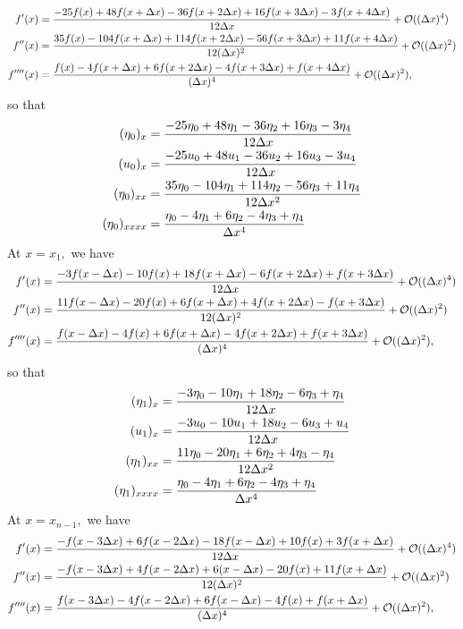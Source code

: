 \documentclass[10pt,reqno,oneside,a4paper]{article}
\begin{document}
\begin{align*}
f'(x)&= \frac{-25f(x) +48 f(x+\Delta x) -36f(x+ 2\Delta x) +16f(x+3\Delta x) - 3f(x+4\Delta x) }{12\Delta x} + \mathcal{O}((\Delta x)^4) \\
f''(x)&= \frac{35f(x)- 104 f(x+\Delta x) + 114 f(x+ 2\Delta x) - 56f(x+3\Delta x) + 11f(x+4\Delta x) }{12(\Delta x)^2} + \mathcal{O}((\Delta x)^2) \\
f''''(x)&= \frac{f(x) -4 f(x+\Delta x) + 6f (x+2\Delta x)- 4f(x+ 3\Delta x) + f(x+4\Delta x)}{(\Delta x)^4} + \mathcal{O}((\Delta x)^2),
\end{align*}
so that 
\begin{align*}
(\eta_0)_x &= \frac{-25\eta_0 +48 \eta_{1} -36\eta_2+16\eta_3 - 3\eta_4}{12\Delta x} \\
(u_0)_x &= \frac{-25u_0 +48 u_{1} -36u_2+16u_3 - 3u_4}{12\Delta x} \\
(\eta_0)_{xx} &= \frac{35\eta_0 -104 \eta_{1} +114 \eta_2 -56\eta_3 + 11\eta_4}{12\Delta x^2} \\
(\eta_0)_{xxxx} &= \frac{\eta_0 -4 \eta_{1} +6 \eta_2 -4\eta_3 + \eta_4}{\Delta x^4}
\end{align*}
At $x= x_1,$ we have 
\begin{align*}
f'(x)&= \frac{-3f(x-\Delta x) -10 f(x) +18f(x+ \Delta x) -6f(x+2\Delta x) + f(x+3\Delta x) }{12\Delta x} + \mathcal{O}((\Delta x)^4) \\
f''(x)&= \frac{11f(x-\Delta x) -20 f(x) +6f(x+ \Delta x) +4f(x+2\Delta x) - f(x+3\Delta x)}{12(\Delta x)^2} + \mathcal{O}((\Delta x)^2) \\
f''''(x)&= \frac{f(x-\Delta x) -4 f(x) +6f(x+ \Delta x) -4f(x+2\Delta x) + f(x+3\Delta x)}{(\Delta x)^4} + \mathcal{O}((\Delta x)^2),
\end{align*}
so that 
\begin{align*}
(\eta_1)_x &= \frac{-3\eta_0 -10 \eta_{1} + 18 \eta_2 -6 \eta_3 + \eta_4}{12\Delta x} \\
(u_1)_x &= \frac{-3u_0 - 10 u_{1} + 18 u_2 - 6 u_3 + u_4}{12\Delta x} \\
(\eta_1)_{xx} &= \frac{11\eta_0 -20 \eta_{1} +6 \eta_2 + 4\eta_3 - \eta_4}{12\Delta x^2} \\
(\eta_1)_{xxxx} &= \frac{\eta_0 -4 \eta_{1} +6 \eta_2 -4\eta_3 + \eta_4}{\Delta x^4}
\end{align*}
At $x= x_{n-1},$ we have
\begin{align*}
f'(x)&= \frac{-f(x-3\Delta x) +6 f(x- 2\Delta x) -18f(x- \Delta x) +10f(x) + 3f(x+\Delta x) }{12\Delta x} + \mathcal{O}((\Delta x)^4) \\
f''(x)&= \frac{-f(x-3\Delta x) +4 f(x- 2\Delta x) +6(x- \Delta x) -20 f(x) + 11 f(x+\Delta x) }{12(\Delta x)^2} + \mathcal{O}((\Delta x)^2) \\
f''''(x)&= \frac{f(x-3\Delta x) -4 f(x- 2\Delta x) +6f(x- \Delta x) -4f(x) + f(x+\Delta x) }{(\Delta x)^4} + \mathcal{O}((\Delta x)^2),
\end{align*}
\end{document}

